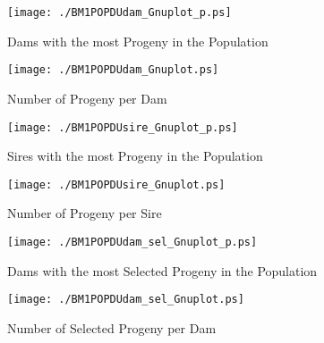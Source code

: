 \begin{figure}[h]
\begin{center}{
\caption{Dams with the most Progeny in the Population}
  \texttt{[image: ./BM1POPDUdam\_Gnuplot\_p.ps]}
  }\end{center}
  \end{figure}
  

\begin{figure}[h]
\begin{center}{
\caption{Number of Progeny per Dam }
  \texttt{[image: ./BM1POPDUdam\_Gnuplot.ps]}
  }\end{center}
  \end{figure}
  

\begin{figure}[h]
\begin{center}{
\caption{Sires with the most Progeny in the Population}
  \texttt{[image: ./BM1POPDUsire\_Gnuplot\_p.ps]}
  }\end{center}
  \end{figure}
  

\begin{figure}[h]
\begin{center}{
\caption{Number of Progeny per Sire }
  \texttt{[image: ./BM1POPDUsire\_Gnuplot.ps]}
  }\end{center}
  \end{figure}
  

\begin{figure}[h]
\begin{center}{
\caption{Dams with the most Selected Progeny in the Population}
  \texttt{[image: ./BM1POPDUdam\_sel\_Gnuplot\_p.ps]}
  }\end{center}
  \end{figure}
  

\begin{figure}[h]
\begin{center}{
\caption{Number of Selected Progeny per Dam}
  \texttt{[image: ./BM1POPDUdam\_sel\_Gnuplot.ps]}
  }\end{center}
  \end{figure}
  

